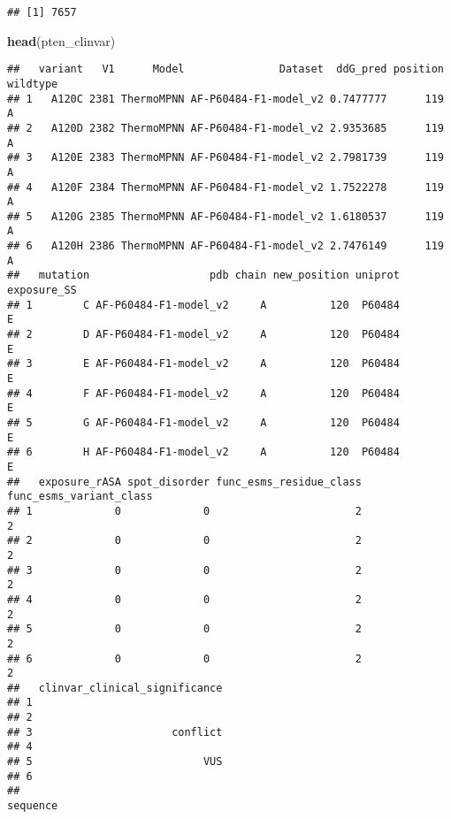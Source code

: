 \documentclass[
]{article}
\newenvironment{Shaded}{\begin{snugshade}}{\end{snugshade}}
\newcommand{\FunctionTok}[1]{\textcolor[rgb]{0.13,0.29,0.53}{\textbf{#1}}}
\newcommand{\NormalTok}[1]{#1}
\begin{document}
\begin{verbatim}
## [1] 7657
\end{verbatim}

\begin{Shaded}
\begin{Highlighting}[]
\FunctionTok{head}\NormalTok{(pten\_clinvar)}
\end{Highlighting}
\end{Shaded}

\begin{verbatim}
##   variant   V1      Model               Dataset  ddG_pred position wildtype
## 1   A120C 2381 ThermoMPNN AF-P60484-F1-model_v2 0.7477777      119        A
## 2   A120D 2382 ThermoMPNN AF-P60484-F1-model_v2 2.9353685      119        A
## 3   A120E 2383 ThermoMPNN AF-P60484-F1-model_v2 2.7981739      119        A
## 4   A120F 2384 ThermoMPNN AF-P60484-F1-model_v2 1.7522278      119        A
## 5   A120G 2385 ThermoMPNN AF-P60484-F1-model_v2 1.6180537      119        A
## 6   A120H 2386 ThermoMPNN AF-P60484-F1-model_v2 2.7476149      119        A
##   mutation                   pdb chain new_position uniprot exposure_SS
## 1        C AF-P60484-F1-model_v2     A          120  P60484           E
## 2        D AF-P60484-F1-model_v2     A          120  P60484           E
## 3        E AF-P60484-F1-model_v2     A          120  P60484           E
## 4        F AF-P60484-F1-model_v2     A          120  P60484           E
## 5        G AF-P60484-F1-model_v2     A          120  P60484           E
## 6        H AF-P60484-F1-model_v2     A          120  P60484           E
##   exposure_rASA spot_disorder func_esms_residue_class func_esms_variant_class
## 1             0             0                       2                       2
## 2             0             0                       2                       2
## 3             0             0                       2                       2
## 4             0             0                       2                       2
## 5             0             0                       2                       2
## 6             0             0                       2                       2
##   clinvar_clinical_significance
## 1                              
## 2                              
## 3                      conflict
## 4                              
## 5                           VUS
## 6                              
##                                                                                                                                                                                                                                                                                                                                                                                                              sequence

\end{verbatim}
\end{document}
